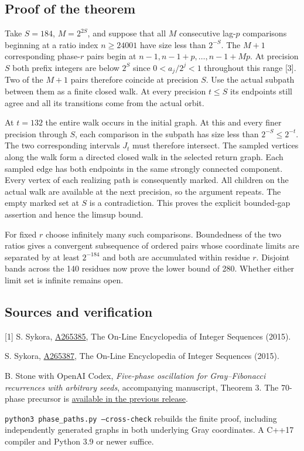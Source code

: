 \documentclass[11pt,letterpaper]{article}
\begin{document}
\subsection*{Proof of the theorem}
Take $S=184$, $M=2^{2S}$, and suppose that all $M$ consecutive lag-$p$ comparisons beginning at a ratio index $n\ge24001$ have size less than $2^{-S}$. The $M+1$ corresponding phase-$r$ pairs begin at $n-1,n-1+p,\ldots,n-1+Mp$. At precision $S$ both prefix integers are below $2^S$ since $0<a_j/2^j<1$ throughout this range [3]. Two of the $M+1$ pairs therefore coincide at precision $S$. Use the actual subpath between them as a finite closed walk. At every precision $t\le S$ its endpoints still agree and all its transitions come from the actual orbit.

At $t=132$ the entire walk occurs in the initial graph. At this and every finer precision through $S$, each comparison in the subpath has size less than $2^{-S}\le 2^{-t}$. The two corresponding intervals $J_t$ must therefore intersect. The sampled vertices along the walk form a directed closed walk in the selected return graph. Each sampled edge has both endpoints in the same strongly connected component. Every vertex of each realizing path is consequently marked. All children on the actual walk are available at the next precision, so the argument repeats. The empty marked set at $S$ is a contradiction. This proves the explicit bounded-gap assertion and hence the limsup bound.

For fixed $r$ choose infinitely many such comparisons. Boundedness of the two ratios gives a convergent subsequence of ordered pairs whose coordinate limits are separated by at least $2^{-184}$ and both are accumulated within residue $r$. Disjoint bands across the 140 residues now prove the lower bound of 280. Whether either limit set is infinite remains open.

\subsection*{Sources and verification}
\small
[1] S. Sykora, \href{https://oeis.org/A265385}{A265385}, The On-Line Encyclopedia of Integer Sequences (2015).\par
[2] S. Sykora, \href{https://oeis.org/A265387}{A265387}, The On-Line Encyclopedia of Integer Sequences (2015).\par
[3] B. Stone with OpenAI Codex, \emph{Five-phase oscillation for Gray--Fibonacci recurrences with arbitrary seeds}, accompanying manuscript, Theorem 3. The 70-phase precursor is \href{https://github.com/blakestone-x/math/tree/c18014b822980b0d6cb9b78fc228e5efda2718c6/A265387}{available in the previous release}.\par
\texttt{python3 phase\_paths.py --cross-check} rebuilds the finite proof, including independently generated graphs in both underlying Gray coordinates. A C++17 compiler and Python 3.9 or newer suffice.
\end{document}
